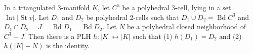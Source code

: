 In a triangulated 3-manifold $K$, let $C^3$ be a polyhedral 3-cell, lying in a set $\operatorname{Int} |\operatorname{St} v|$. Let $D_1$ and $D_2$ be polyhedral 2-cells such that $D_1 \cup D_2 = \operatorname{Bd} C^3$ and $D_1 \cap D_2 = J = \operatorname{Bd} D_1 = \operatorname{Bd} D_2$. Let $N$ be a polyhedral closed neighborhood of $C^3 - J$. Then there is a PLH $h: |K| \leftrightarrow |K|$ such that (1) $h(D_1) = D_2$ and (2) $h(|K| - N)$ is the identity.
